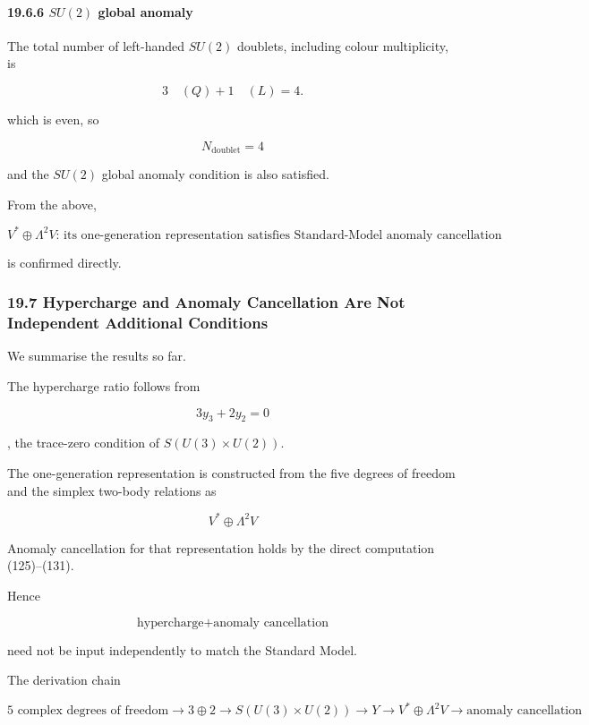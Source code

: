 \documentclass[
  a4paper,
]{article}
\begin{document}
\paragraph{\texorpdfstring{19.6.6 \(SU(2)\) global
anomaly}{19.6.6 SU(2) global anomaly}}\label{su2-global-anomaly}

The total number of left-handed \(SU(2)\) doublets, including colour
multiplicity, is

\[
3\quad(Q)
+
1\quad(L)
=
4.
\]

which is even, so

\[
\boxed{
N_{\mathrm{doublet}}=4
}
\tag{131}
\]

and the \(SU(2)\) global anomaly condition is also satisfied.

From the above,

\[
\boxed{
V^*\oplus\Lambda^2V
\text{: its one-generation representation satisfies Standard-Model anomaly cancellation}
}
\tag{132}
\]

is confirmed directly.

\subsubsection{19.7 Hypercharge and Anomaly Cancellation Are Not
Independent Additional
Conditions}\label{hypercharge-and-anomaly-cancellation-are-not-independent-additional-conditions}

We summarise the results so far.

The hypercharge ratio follows from

\[
\boxed{
3y_3+2y_2=0
}
\]

, the trace-zero condition of \(S(U(3)\times U(2))\).

The one-generation representation is constructed from the five degrees
of freedom and the simplex two-body relations as

\[
\boxed{
V^*\oplus\Lambda^2V
}
\]

Anomaly cancellation for that representation holds by the direct
computation (125)--(131).

Hence

\[
\boxed{
\text{hypercharge}
+
\text{anomaly cancellation}
}
\tag{133}
\]

need not be input independently to match the Standard Model.

The derivation chain

\[
\boxed{
5\text{ complex degrees of freedom}
\to
3\oplus2
\to
S(U(3)\times U(2))
\to
Y
\to
V^*\oplus\Lambda^2V
\to
\text{anomaly cancellation}
}
\tag{134}
\]
\end{document}
